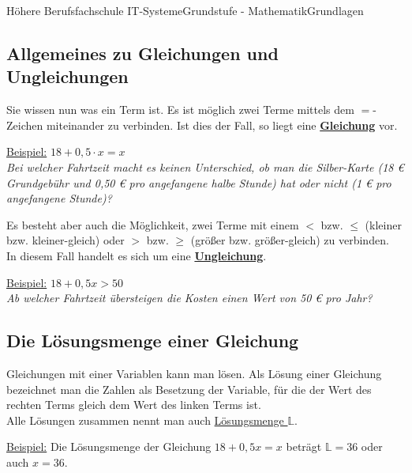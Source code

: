 \documentclass[11pt,twocolumn,oneside,openany,headings=optiontotoc,11pt,numbers=noenddot]{article}
\begin{document}
\begin{worksheet}{Höhere Berufsfachschule IT-Systeme}{Grundstufe - Mathematik}{Grundlagen}
		\subsection{Allgemeines zu Gleichungen und Ungleichungen}
		Sie wissen nun was ein Term ist. Es ist möglich zwei Terme mittels dem \glqq{}\(=\)\grqq{}-Zeichen miteinander zu verbinden. Ist dies der Fall, so liegt eine \underline{\textbf{Gleichung}} vor.\\
		\par\bigskip\noindent
		\underline{Beispiel:} \(18 + 0,5\cdot{}x = x\)\\
		\glqq{}\textit{Bei welcher Fahrtzeit macht es keinen Unterschied, ob man die Silber-Karte (18 \euro{} Grundgebühr und 0,50 \euro{} pro angefangene halbe Stunde) hat oder nicht (1 \euro{} pro angefangene Stunde)?}\grqq{}\\
		\par\bigskip\noindent
		Es besteht aber auch die Möglichkeit, zwei Terme mit einem \glqq{}\(<\)\grqq{} bzw. \glqq{}\(\leq\)\grqq{} (\glqq{}kleiner\grqq{} bzw. \glqq{}kleiner-gleich\grqq{}) oder \glqq{}\(>\)\grqq{} bzw. \glqq{}\(\geq\)\grqq{} (\glqq{}größer\grqq{} bzw. \glqq{}größer-gleich\grqq{}) zu verbinden.\\
		In diesem Fall handelt es sich um eine \underline{\textbf{Ungleichung}}.\\
		\par\bigskip\noindent
		\underline{Beispiel:} \(18 + 0,5x > 50\)\\
		\glqq{}\textit{Ab welcher Fahrtzeit übersteigen die Kosten einen Wert von 50 \euro{} pro Jahr?}\grqq{}\\
		\subsection{Die Lösungsmenge einer Gleichung}
		Gleichungen mit einer Variablen kann man lösen. Als Lösung einer Gleichung bezeichnet man die Zahlen als Besetzung der Variable, für die der Wert des rechten Terms gleich dem Wert des linken Terms ist.\\
		Alle Lösungen zusammen nennt man auch \underline{Lösungsmenge \(\mathbb{L}\)}.\\
		\par\bigskip\noindent
		\underline{Beispiel:} Die Lösungsmenge der Gleichung \(18 + 0,5x = x\) beträgt \(\mathbb{L} = {36}\) oder auch \(x=36\).

\end{worksheet}
\end{document}
